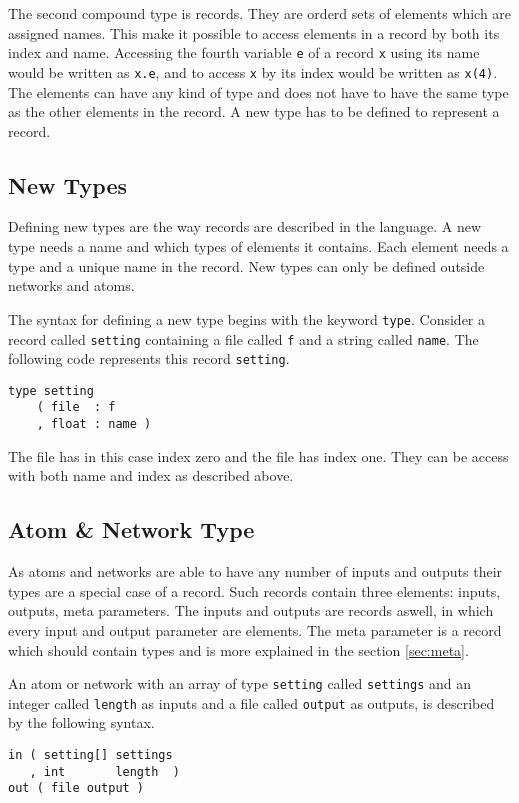 The second compound type is records. They are orderd sets of elements
which are assigned names. This make it possible to access elements in
a record by both its index and name. Accessing the fourth variable
\verb#e# of a record \verb#x# using its name would be written as
\verb#x.e#, and to access \verb#x# by its index would be written as
\verb#x(4)#. The elements can have any kind of type and does not have
to have the same type as the other elements in the record. A new type
has to be defined to represent a record.

\subsection{New Types}
Defining new types are the way records are described in the
language. A new type needs a name and which types of elements it
contains. Each element needs a type and a unique name in the
record. New types can only be defined outside networks and atoms.

The syntax for defining a new type begins with the keyword
\verb#type#. Consider a record called \verb#setting# containing a file
called \verb#f# and a string called \verb#name#. The following code
represents this record \verb#setting#.

\begin{verbatim}
type setting
    ( file  : f
    , float : name )
\end{verbatim}

The file has in this case index zero and the file has index one. They
can be access with both name and index as described above.

\subsection{Atom \& Network Type}
As atoms and networks are able to have any number of inputs and
outputs their types are a special case of a record. Such records
contain three elements: inputs, outputs, meta parameters. The inputs
and outputs are records aswell, in which every input and output
parameter are elements. The meta parameter is a record which should
contain types and is more explained in the section \autoref{sec:meta}.

An atom or network with an array of type \verb#setting# called
\verb#settings# and an integer called \verb#length# as inputs and a
file called \verb#output# as outputs, is described by the following
syntax.

\begin{verbatim}
in ( setting[] settings
   , int       length  )
out ( file output )
\end{verbatim}

